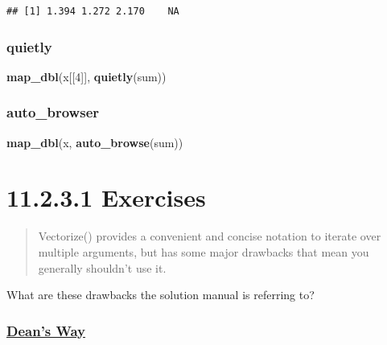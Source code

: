 \documentclass[]{book}
\newenvironment{Shaded}{\begin{snugshade}}{\end{snugshade}}
\newcommand{\DecValTok}[1]{\textcolor[rgb]{0.00,0.00,0.81}{#1}}
\newcommand{\KeywordTok}[1]{\textcolor[rgb]{0.13,0.29,0.53}{\textbf{#1}}}
\newcommand{\NormalTok}[1]{#1}
\begin{document}
\begin{verbatim}
## [1] 1.394 1.272 2.170    NA
\end{verbatim}

\hypertarget{quietly}{%
\subsubsection*{quietly}\label{quietly}}

\begin{Shaded}
\begin{Highlighting}[]
\KeywordTok{map_dbl}\NormalTok{(x[[}\DecValTok{4}\NormalTok{]], }\KeywordTok{quietly}\NormalTok{(sum))}
\end{Highlighting}
\end{Shaded}

\hypertarget{auto_browser}{%
\subsubsection*{auto\_browser}\label{auto_browser}}

\begin{Shaded}
\begin{Highlighting}[]
\KeywordTok{map_dbl}\NormalTok{(x, }\KeywordTok{auto_browse}\NormalTok{(sum))}
\end{Highlighting}
\end{Shaded}

\hypertarget{exercises-9}{%
\section*{11.2.3.1 Exercises}\label{exercises-9}}

\begin{quote}
Vectorize() provides a convenient and concise notation to iterate over multiple arguments, but has some major drawbacks that mean you generally shouldn't use it.
\end{quote}

What are these drawbacks the solution manual is referring to?

\hypertarget{deans-way}{%
\subsubsection{\texorpdfstring{\href{https://deanattali.com/blog/mutate-non-vectorized/}{Dean's Way}}{Dean's Way}}\label{deans-way}}
\end{document}
